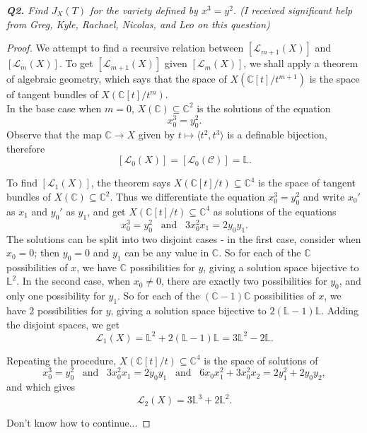 \documentclass{article}
\begin{document}
\it \textbf{Q2.} Find $J_X(T)$ for the variety defined by $x^3=y^2$. (I
received significant help from Greg, Kyle, Rachael, Nicolas, and Leo on
this question)
\begin{proof}
  We attempt to find a recursive relation between $[\mathcal{L}_{m+1}(X)]$
  and $[\mathcal{L}_{m}(X)]$. To get $[\mathcal{L}_{m+1}(X)]$ given
  $[\mathcal{L}_{m}(X)]$, we shall apply a theorem of algebraic geometry,
  which says that the space of $X(\mathbb{C}[t]/t^{m+1})$ is the space of
  tangent bundles of $X(\mathbb{C}[t]/t^{m})$. \\

  In the base case when $m=0$, $X(\mathbb{C}) \subseteq\mathbb{C}^2$
  is the solutions of the equation
  \[x_0^3=y_0^2.\]
  Observe that the map $\mathbb{C}\rightarrow X$ given by $t\mapsto\langle
  t^2,t^3\rangle$ is a definable bijection, therefore
  \[[\mathcal{L}_0(X)] =[\mathcal{L}_0(\mathcal{C})] =\mathbb{L}.\]

  To find $[\mathcal{L}_{1}(X)]$, the theorem says $X(\mathbb{C}[t]/t)
  \subseteq\mathbb{C}^4$ is the space of tangent bundles of
  $X(\mathbb{C})\subseteq\mathbb{C}^2$. Thus we differentiate the
  equation $x_0^3=y_0^2$ and write $x_0'$ as $x_1$ and $y_0'$ as $y_1$, and
  get $X(\mathbb{C}[t]/t) \subseteq\mathbb{C}^4$ as solutions of the
  equations
  \[x_0^3=y_0^2\;\;\; \text{and}\;\;\; 3x_0^2x_1=2y_0y_1.\]
  The solutions can be split into two disjoint cases - in the first case,
  consider when $x_0=0$; then $y_0=0$ and $y_1$ can be any value in
  $\mathbb{C}$. So for each of the $\mathbb{C}$ possibilities of $x$, we
  have $\mathbb{C}$ possibilities for $y$, giving a solution space
  bijective to $\mathbb{L}^2$. In the second case, when $x_0\neq0$, there
  are exactly two possibilities for $y_0$, and only one possibility for
  $y_1$. So for each of the $(\mathbb{C}-1)\mathbb{C}$ possibilities of
  $x$, we have $2$ possibilities for $y$, giving a solution space bijective
  to $2(\mathbb{L}-1)\mathbb{L}$. Adding the disjoint spaces, we get
  \[\mathcal{L}_1(X) =\mathbb{L}^2 +2(\mathbb{L}-1)\mathbb{L}
  =3\mathbb{L}^2-2\mathbb{L}.\]

  Repeating the procedure, $X(\mathbb{C}[t]/t) \subseteq\mathbb{C}^4$ is
  the space of solutions of
  \[x_0^3=y_0^2\;\;\; \text{and}\;\;\; 3x_0^2x_1=2y_0y_1\;\;\;
  \text{and}\;\;\; 6x_0x_1^2+3x_0^2x_2=2y_1^2+2y_0y_2,\]
  and which gives 
  \[\mathcal{L}_2(X) =3\mathbb{L}^3 +2\mathbb{L}^2.\]

  Don't know how to continue...
\end{proof}
\end{document}
